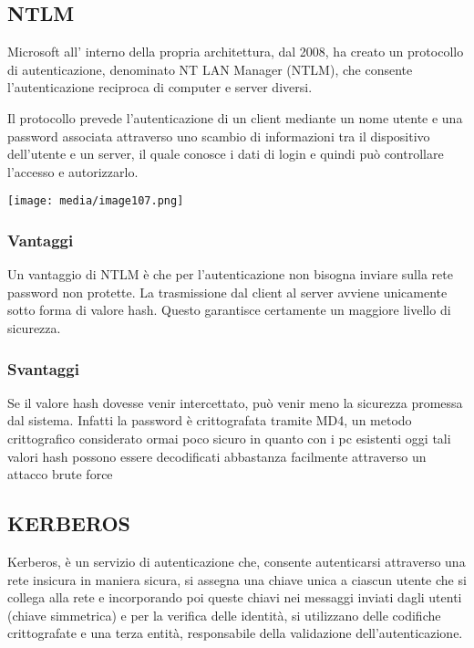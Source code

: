 \subsection{NTLM}\label{ntlm}

Microsoft all' interno della propria architettura, dal 2008, ha creato
un protocollo di autenticazione, denominato NT LAN Manager (NTLM), che
consente l'autenticazione reciproca di computer e server diversi.

Il protocollo prevede l'autenticazione di un client mediante un nome
utente e una password associata attraverso uno scambio di informazioni
tra il dispositivo dell'utente e un server, il quale conosce i dati di
login e quindi può controllare l'accesso e autorizzarlo.

\texttt{[image: media/image107.png]}

\subsubsection{Vantaggi}\label{vantaggi}

Un vantaggio di NTLM è che per l'autenticazione non bisogna inviare
sulla rete password non protette. La trasmissione dal client al server
avviene unicamente sotto forma di valore hash. Questo garantisce
certamente un maggiore livello di sicurezza.

\subsubsection{Svantaggi}\label{svantaggi}

Se il valore hash dovesse venir intercettato, può venir meno la
sicurezza promessa dal sistema. Infatti la password è crittografata
tramite MD4, un metodo crittografico considerato ormai poco sicuro in
quanto con i pc esistenti oggi tali valori hash possono essere
decodificati abbastanza facilmente attraverso un attacco brute force

\subsection{KERBEROS}\label{kerberos}

Kerberos, è un servizio di autenticazione che, consente autenticarsi
attraverso una rete insicura in maniera sicura, si assegna una chiave
unica a ciascun utente che si collega alla rete e incorporando poi
queste chiavi nei messaggi inviati dagli utenti (chiave simmetrica) e
per la verifica delle identità, si utilizzano delle codifiche
crittografate e una terza entità, responsabile della validazione
dell'autenticazione.

